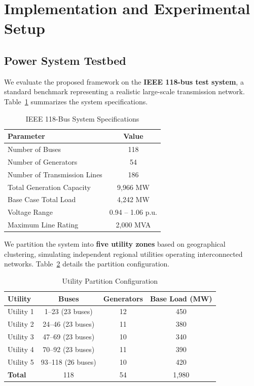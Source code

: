 \documentclass[journal,10pt]{IEEEtran}
\begin{document}
\section{Implementation and Experimental Setup}

\subsection{Power System Testbed}

We evaluate the proposed framework on the \textbf{IEEE 118-bus test system}, a standard benchmark representing a realistic large-scale transmission network. Table~\ref{tab:system_specs} summarizes the system specifications.

\begin{table}[t]
\centering
\caption{IEEE 118-Bus System Specifications}
\label{tab:system_specs}
\begin{tabular}{lc}
\toprule
\textbf{Parameter} & \textbf{Value} \\
\midrule
Number of Buses & 118 \\
Number of Generators & 54 \\
Number of Transmission Lines & 186 \\
Total Generation Capacity & 9,966 MW \\
Base Case Total Load & 4,242 MW \\
Voltage Range & 0.94 -- 1.06 p.u. \\
Maximum Line Rating & 2,000 MVA \\
\bottomrule
\end{tabular}
\end{table}

We partition the system into \textbf{five utility zones} based on geographical clustering, simulating independent regional utilities operating interconnected networks. Table~\ref{tab:partitions} details the partition configuration.

\begin{table}[t]
\centering
\caption{Utility Partition Configuration}
\label{tab:partitions}
\begin{tabular}{lccc}
\toprule
\textbf{Utility} & \textbf{Buses} & \textbf{Generators} & \textbf{Base Load (MW)} \\
\midrule
Utility 1 & 1--23 (23 buses) & 12 & 450 \\
Utility 2 & 24--46 (23 buses) & 11 & 380 \\
Utility 3 & 47--69 (23 buses) & 10 & 340 \\
Utility 4 & 70--92 (23 buses) & 11 & 390 \\
Utility 5 & 93--118 (26 buses) & 10 & 420 \\
\midrule
\textbf{Total} & 118 & 54 & 1,980 \\
\bottomrule
\end{tabular}
\end{table}
\end{document}
